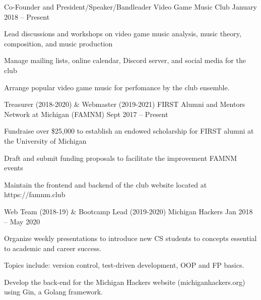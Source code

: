 \documentclass[]{awesome-cv}
\begin{document}
\vspace{-2mm}
\vspace{-2mm}
	\cventry
	{Co-Founder and President/Speaker/Bandleader}
	{Video Game Music Club}
	{}
	{January 2018 – Present}
	{\begin{cvitems}
		\item {Lead discussions and workshops on video game music analysis, music theory, composition, and music production}
		\item {Manage mailing lists, online calendar, Discord server, and social media for the club}
		\item {Arrange popular video game music for perfomance by the club ensemble.}
		\end{cvitems}}

	\vspace{-4mm}
	\cventry
	{Treasurer (2018-2020) \& Webmaster (2019-2021)}
	{FIRST Alumni and Mentors Network at Michigan (FAMNM)}
	{}
	{Sept 2017 – Present}
	{\begin{cvitems}
		\item {Fundraise over \$25,000 to establish an endowed scholarship for FIRST alumni at the University of Michigan}
		\item {Draft and submit funding proposals to facilitate the improvement FAMNM events}
		\item {Maintain the frontend and backend of the club website located at https://famnm.club}
		\end{cvitems}}
	
	\vspace{-4mm}
	\cventry
	{Web Team (2018-19) \& Bootcamp Lead (2019-2020)}
	{Michigan Hackers}
	{}
	{Jan 2018 – May 2020}
	{\begin{cvitems}
		\item {Organize weekly presentations to introduce new CS students to concepts essential to academic and career success.}
		\item {Topics include: version control, test-driven development, OOP and FP basics.}
		\item {Develop the back-end for the Michigan Hackers website (michiganhackers.org) using Gin, a Golang framework.}
		\end{cvitems}}
	\vspace{-4mm}

\end{document}
